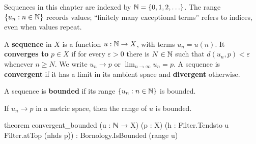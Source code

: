 Sequences in this chapter are indexed by $\mathbb{N}=\{0,1,2,\ldots\}$.
The range $\{u_n:n\in\mathbb{N}\}$ records values; ``finitely many exceptional terms'' refers to indices,
even when values repeat.

\begin{definition}
  \label{an1:def:sequence-convergence}
  A \textbf{sequence} in $X$ is a function $u:\mathbb{N}\to X$, with terms $u_n=u(n)$.
  It \textbf{converges to} $p\in X$ if for every $\varepsilon>0$ there is $N\in\mathbb{N}$ such that
  $d(u_n,p)<\varepsilon$ whenever $n\geq N$.
  We write $u_n\to p$ or $\lim_{n\to\infty}u_n=p$.
  A sequence is \textbf{convergent} if it has a limit in its ambient space and \textbf{divergent}
  otherwise.
\end{definition}

\begin{definition}
  \label{an1:def:bounded-sequence}
  A sequence is \textbf{bounded} if its range $\{u_n:n\in\mathbb{N}\}$ is bounded.
\end{definition}

\begin{lemma}
  \label{an1:lem:convergent-bounded}
  If $u_n\to p$ in a metric space, then the range of $u$ is bounded.

  \begin{lean}
    theorem convergent_bounded (u : ℕ → X) (p : X) (h : Filter.Tendsto u Filter.atTop (nhds p)) :
        Bornology.IsBounded (range u)
  \end{lean}
\end{lemma}

